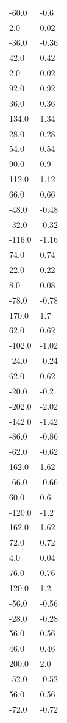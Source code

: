 \begin{longtable}{ll}
-60.0 & -0.6 \\
2.0 & 0.02 \\
-36.0 & -0.36 \\
42.0 & 0.42 \\
2.0 & 0.02 \\
92.0 & 0.92 \\
36.0 & 0.36 \\
134.0 & 1.34 \\
28.0 & 0.28 \\
54.0 & 0.54 \\
90.0 & 0.9 \\
112.0 & 1.12 \\
66.0 & 0.66 \\
-48.0 & -0.48 \\
-32.0 & -0.32 \\
-116.0 & -1.16 \\
74.0 & 0.74 \\
22.0 & 0.22 \\
8.0 & 0.08 \\
-78.0 & -0.78 \\
170.0 & 1.7 \\
62.0 & 0.62 \\
-102.0 & -1.02 \\
-24.0 & -0.24 \\
62.0 & 0.62 \\
-20.0 & -0.2 \\
-202.0 & -2.02 \\
-142.0 & -1.42 \\
-86.0 & -0.86 \\
-62.0 & -0.62 \\
162.0 & 1.62 \\
-66.0 & -0.66 \\
60.0 & 0.6 \\
-120.0 & -1.2 \\
162.0 & 1.62 \\
72.0 & 0.72 \\
4.0 & 0.04 \\
76.0 & 0.76 \\
120.0 & 1.2 \\
-56.0 & -0.56 \\
-28.0 & -0.28 \\
56.0 & 0.56 \\
46.0 & 0.46 \\
200.0 & 2.0 \\
-52.0 & -0.52 \\
56.0 & 0.56 \\
-72.0 & -0.72 \\

\end{longtable}
